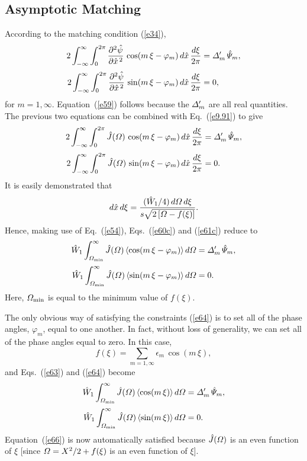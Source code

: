 \documentclass[12pt,prb,aps]{revtex4-1}
\begin{document}
\subsection{Asymptotic Matching} 
According to the matching condition (\ref{e34}),
\begin{align}
2\int_{-\infty}^\infty \int_0^{2\pi} \frac{\partial^2\hat{\psi}}{\partial \hat{x}^{\,2}}\,\cos(m\,\xi-\varphi_m)\,d\hat{x}\,\frac{d\xi}{2\pi}& = {\mit\Delta}_m'\,\hat{\mit\Psi}_m,\\[0.5ex]
2\int_{-\infty}^\infty \int_0^{2\pi} \frac{\partial^2\hat{\psi}}{\partial \hat{x}^{\,2}}\,\sin(m\,\xi-\varphi_m)\,d\hat{x}\,\frac{d\xi}{2\pi}& =0,\label{e59}
\end{align}
for $m=1,\infty$. Equation~(\ref{e59}) follows because the ${\mit\Delta}_m'$ are all real quantities. 
The previous two equations can be combined with Eq.~(\ref{e9.91}) to give 
\begin{align}\label{e60c}
2\int_{-\infty}^\infty \int_0^{2\pi} \hat{J}({\mit\Omega})\,\cos(m\,\xi-\varphi_m)\,d\hat{x}\,\frac{d\xi}{2\pi}& = {\mit\Delta}_m'\,\hat{\mit\Psi}_m,\\[0.5ex]
2\int_{-\infty}^\infty \int_0^{2\pi} \hat{J}({\mit\Omega})\,\sin(m\,\xi-\varphi_m)\,d\hat{x}\,\frac{d\xi}{2\pi}& =0.\label{e61c}
\end{align}
 It is easily demonstrated that 
\begin{equation}
d\hat{x}\,d\xi = \frac{(\hat{W}_1/4)\,d{\mit\Omega}\,d\xi}{s\sqrt{2\left[{\mit\Omega}-f(\xi)\right]}}.
\end{equation}
Hence, making use of  Eq.~(\ref{e54}), Eqs.~(\ref{e60c}) and (\ref{e61c}) reduce to 
\begin{align}\label{e63}
\hat{W}_1\int_{{\mit\Omega}_{\rm min}}^\infty\hat{J}({\mit\Omega})\,\langle\cos(m\,\xi-\varphi_m)\rangle\,d{\mit\Omega}&= {\mit\Delta}_m'\,\hat{\mit\Psi}_m,\\[0.5ex]
\hat{W}_1\int_{{\mit\Omega}_{\rm min}}^\infty\hat{J}({\mit\Omega})\,\langle\sin(m\,\xi-\varphi_m)\rangle\,d{\mit\Omega}&=0.\label{e64}
\end{align}
Here, ${\mit\Omega}_{\rm min}$ is equal to the minimum value of $f(\xi)$. 

The only obvious way of satisfying the constraints (\ref{e64}) is to set all of the phase angles, $\varphi_m$, equal to
one another. In fact, without loss of generality, we can set all of the phase angles equal to zero. In this case,
\begin{equation}\label{e65}
f(\xi) = \sum_{m=1,\infty} \epsilon_m\,\cos(m\,\xi),
\end{equation}
and Eqs.~(\ref{e63}) and (\ref{e64}) become 
\begin{align}\label{e65a}
\hat{W}_1\int_{{\mit\Omega}_{\rm min}}^\infty\hat{J}({\mit\Omega})\,\langle\cos(m\,\xi)\rangle\,d{\mit\Omega}&= {\mit\Delta}_m'\,\hat{\mit\Psi}_m,\\[0.5ex]
\hat{W}_1\int_{{\mit\Omega}_{\rm min}}^\infty\hat{J}({\mit\Omega})\,\langle\sin(m\,\xi)\rangle\,d{\mit\Omega}&=0.\label{e66}
\end{align}
Equation~(\ref{e66}) is now automatically satisfied because $\hat{J}({\mit\Omega})$ is an even function of $\xi$ [since ${\mit\Omega}= X^2/2+f(\xi)$ is an even function of $\xi$]. 
\end{document}
